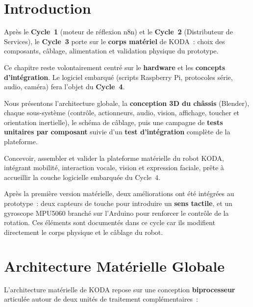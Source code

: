 \documentclass[a4paper,12pt]{report}
\begin{document}
	\section{Introduction}
	
	Après le \textbf{Cycle~1} (moteur de réflexion n8n) et le \textbf{Cycle~2}
	(Distributeur de Services), le \textbf{Cycle~3} porte sur le
	\textbf{corps matériel} de KODA~: choix des composants, câblage, alimentation
	et validation physique du prototype.
	
	Ce chapitre reste volontairement centré sur le \textbf{hardware} et les
	\textbf{concepts d'intégration}. Le logiciel embarqué (scripts Raspberry Pi,
	protocoles série, audio, caméra) fera l'objet du \textbf{Cycle~4}.
	
	Nous présentons l'architecture globale, la \textbf{conception 3D du châssis}
	(Blender), chaque sous-système (contrôle, actionneurs, audio, vision,
	affichage, toucher et orientation inertielle), le schéma de câblage, puis une campagne de
	\textbf{tests unitaires par composant} suivie d'un \textbf{test d'intégration}
	complète de la plateforme.
	
	\begin{tcolorbox}[colback=blue!5!white, colframe=blue!60!black,
		title=\textbf{Objectif du Cycle 3}]
		Concevoir, assembler et valider la plateforme matérielle du robot KODA,
		intégrant mobilité, interaction vocale, vision et expression faciale,
		prête à accueillir la couche logicielle embarquée du Cycle~4.
	\end{tcolorbox}

	Après la première version matérielle, deux améliorations ont été intégrées au
	prototype~: deux capteurs de touche pour introduire un \textbf{sens tactile},
	et un gyroscope MPU5060 branché sur l'Arduino pour renforcer le contrôle de
	la rotation. Ces éléments sont documentés dans ce cycle car ils modifient
	directement le corps physique et le câblage du robot.

	\section{Architecture Matérielle Globale}
	
	L'architecture matérielle de KODA repose sur une conception \textbf{biprocesseur}
	articulée autour de deux unités de traitement complémentaires~:
	
\end{document}

